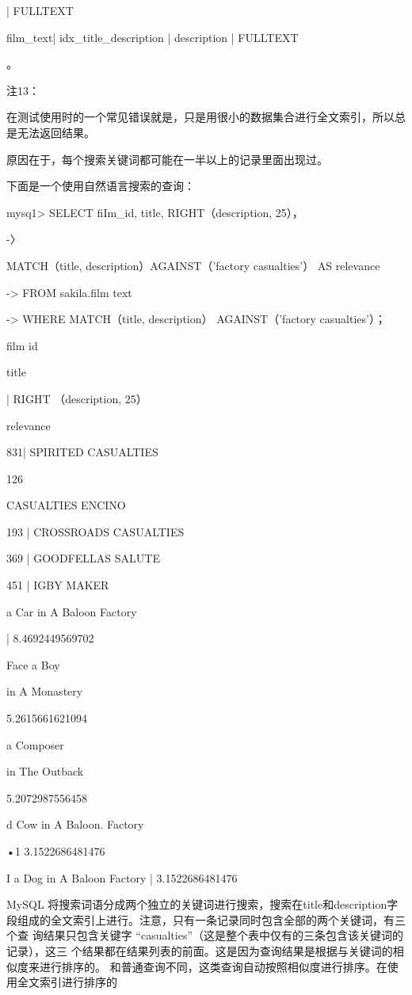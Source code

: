 | FULLTEXT

film\_text| idx\_title\_description | description | FULLTEXT

。

注13：

在测试使用时的一个常见错误就是，只是用很小的数据集合进行全文索引，所以总是无法返回结果。

原因在于，每个搜索关键词都可能在一半以上的记录里面出现过。

下面是一个使用自然语言搜索的查询：

mysq1> SELECT fiIm\_id, title, RIGHT（description, 25），

-〉

MATCH（title, description）AGAINST（'factory casualties'） AS relevance

-> FROM sakila.film text

-> WHERE MATCH（title, description） AGAINST（'factory casualties'）；

film id

title

| RIGHT （description, 25）

relevance

831| SPIRITED CASUALTIES

126

CASUALTIES ENCINO

193 | CROSSROADS CASUALTIES

369 | GOODFELLAS SALUTE

451 | IGBY MAKER

a Car in A Baloon Factory

| 8.4692449569702

Face a Boy

in A Monastery

5.2615661621094

a Composer

in The Outback

5.2072987556458

d Cow in A Baloon. Factory

•1 3.1522686481476

I a Dog in A Baloon Factory | 3.1522686481476

MySQL 将搜索词语分成两个独立的关键词进行搜索，搜索在title和description字
段组成的全文索引上进行。注意，只有一条记录同时包含全部的两个关键词，有三个查
询结果只包含关键字 “casualties”（这是整个表中仅有的三条包含该关键词的记录），这三
个结果都在结果列表的前面。这是因为查询结果是根据与关键词的相似度来进行排序的。
和普通查询不同，这类查询自动按照相似度进行排序。在使用全文索引进行排序的

